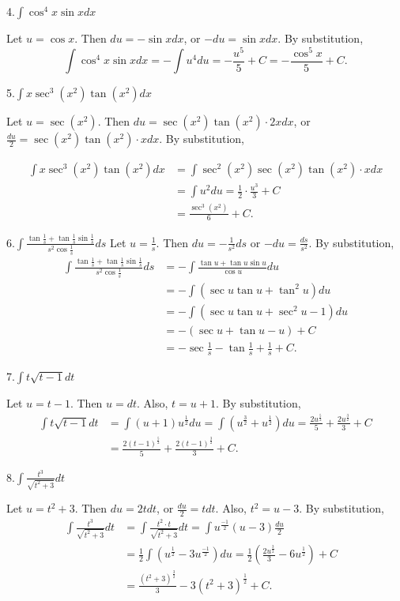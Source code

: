 \documentclass[
  letterpaper,
  DIV=11,
  numbers=noendperiod]{scrartcl}
\begin{document}
4.\(\int \cos^4 x \sin xdx\)

Let \(u=\cos x\). Then \(du=-\sin x dx\), or \(-du=\sin xdx\). By
substitution, \[
\int \cos^4 x \sin xdx=-\int u^4 du=-\frac{u^5}{5}+C=-\frac{\cos^5 x}{5}+C.
\]

5.\(\int x \sec^3 \left( x^2 \right)\tan\left(x^2\right)dx\)

Let \(u=\sec\left (x^2\right)\). Then
\(du=\sec\left(x^2\right)\tan\left(x^2\right)\cdot 2xdx\), or
\(\frac{du}{2}=\sec\left (x^2\right)\tan\left(x^2\right)\cdot xdx\). By
substitution,

\[
\begin{aligned}
\int x\sec^3 \left(x^2\right)\tan\left(x^2\right)dx &= \int \sec^2 \left(x^2\right)\sec\left(x^2\right)\tan\left(x^2\right)\cdot xdx \\ &= \int u^2du=\frac{1}{2}\cdot \frac{u^3}{3}+C \\& = \frac{\sec^3 \left(x^2\right)}{6} + C.
\end{aligned}
\]

6.\(\int \frac{\tan\frac{1}{s}+\tan\frac{1}{s}\sin\frac{1}{s}}{s^2\cos\frac{1}{s}}ds\)
Let \(u=\frac{1}{s}\). Then \(du=-\frac{1}{s^2}ds\) or
\(-du=\frac{ds}{s^2}\). By substitution, \[
\begin{aligned}
\int \frac{\tan\frac{1}{s}+\tan\frac{1}{s}\sin\frac{1}{s}}{s^2\cos\frac{1}{s}}ds &= -\int \frac{\tan u+\tan u \sin u}{\cos u}du\\&=-\int (\sec u \tan u + \tan^2 u)du\\&=-\int (\sec u \tan u +\sec^2 u -1 )du\\&=-(\sec u +\tan u-u) + C\\&=-\sec\frac{1}{s}-\tan\frac{1}{s}+\frac{1}{s}+C.  
\end{aligned}
\]

7.\(\int t\sqrt {t-1} dt\)

Let \(u=t-1\). Then \(u=dt\). Also, \(t=u+1\). By substitution,
\[ \begin{aligned}
\int t\sqrt{t-1} dt &=\int \left(u+1\right)u^\frac{1}{2}du =\int \left( u^\frac{3}{2}+u^\frac{1}{2} \right)du =\frac{2u^\frac{5}{2}}{5}+\frac{2u^\frac{3}{2}}{3}+C\\&=\frac{2\left(t-1\right)^\frac{5}{2}}{5}+\frac{2\left(t-1\right)^\frac{3}{2}}{3}+C.
\end{aligned}
\]

8.\(\int \frac{t^3}{\sqrt{t^2+3}}dt\)

Let \(u=t^2+3\). Then \(du=2tdt\), or \(\frac{du}{2}=tdt\). Also,
\(t^2=u-3\). By substitution, \[
\begin{aligned}
\int \frac{t^3}{\sqrt{t^2+3}}dt &= \int \frac{t^2\cdot{t}}{\sqrt {t^2+3}}dt=\int u^\frac{-1}{2}(u-3)\frac{du}{2}&\\&=\frac{1}{2}\int \left(u^\frac{1}{2}-3u^\frac{-1}{2}\right)du =\frac{1}{2} \left(\frac{2u^\frac{3}{2}}{3}-6u^\frac{1}{2}\right)+C \\& =\frac{\left(t^2+3\right)^\frac{3}{2}}{3}-3\left(t^2+3\right)^\frac{1}{2}+C.
\end{aligned}
\]
\end{document}
